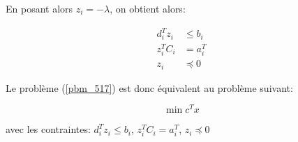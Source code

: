 \documentclass{article}
\begin{document}
En posant alors $z_i = - \lambda$, on obtient alors:

\begin{align*}
d_i^T z_i & \leq b_i \\
z_i^T C_i & = a_i^T \\
z_i & \preceq 0
\end{align*}

Le problème (\ref{pbm_517}) est donc équivalent au problème suivant:

\begin{equation*}
\min c^T x
\end{equation*}

avec les contraintes: $d_i^T z_i \leq b_i$, $z_i^T C_i = a_i^T$, $z_i \preceq 0$
\end{document}
